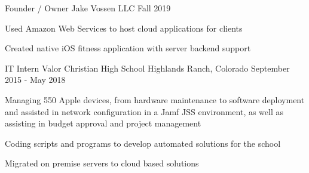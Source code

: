 \begin{cventries}
  \cventry
    {Founder / Owner}
    {Jake Vossen LLC} %
    {} %
    { Fall 2019 }
    {
      \begin{cvitems} %
        \item {Used Amazon Web Services to host cloud applications for clients}
        \item {Created native iOS fitness application with server backend support}        
      \end{cvitems}
    }

  \cventry
    {IT Intern}
    {Valor Christian High School }
    {Highlands Ranch, Colorado} %
    {September 2015 - May 2018} %
    {
      \begin{cvitems} %
        \item {Managing 550 Apple devices, from hardware maintenance
            to software deployment and assisted in network
            configuration in a Jamf JSS environment, as well as
            assisting in budget approval and project management}
        \item {Coding scripts and programs to develop automated
            solutions for the school}
        \item {Migrated on premise servers to cloud based solutions}
      \end{cvitems}
    }
\end{cventries}

